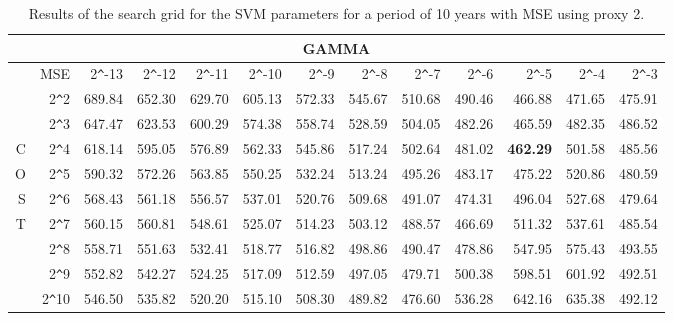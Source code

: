 \begin{table}[h!]
\centering
\begin{adjustbox}{width=\textwidth}
\begin{tabular}{|r|r|rrrrrrrrrrr|}
\hline
\multicolumn{13}{|c|}{GAMMA} \tabularnewline
\hline
 &MSE& 2\verb|^|-13 & 2\verb|^|-12 & 2\verb|^|-11 & 2\verb|^|-10 & 2\verb|^|-9 & 2\verb|^|-8 & 2\verb|^|-7 & 2\verb|^|-6 & 2\verb|^|-5 & 2\verb|^|-4 & 2\verb|^|-3 \\ 
  \hline
  &2\verb|^|2 & 689.84 & 652.30 & 629.70 & 605.13 & 572.33 & 545.67 & 510.68 & 490.46 & 466.88 & 471.65 & 475.91 \\ 
  &2\verb|^|3 & 647.47 & 623.53 & 600.29 & 574.38 & 558.74 & 528.59 & 504.05 & 482.26 & 465.59 & 482.35 & 486.52 \\ 
  C&2\verb|^|4 & 618.14 & 595.05 & 576.89 & 562.33 & 545.86 & 517.24 & 502.64 & 481.02 & \textbf{462.29} & 501.58 & 485.56 \\ 
  O&2\verb|^|5 & 590.32 & 572.26 & 563.85 & 550.25 & 532.24 & 513.24 & 495.26 & 483.17 & 475.22 & 520.86 & 480.59 \\ 
  S&2\verb|^|6 & 568.43 & 561.18 & 556.57 & 537.01 & 520.76 & 509.68 & 491.07 & 474.31 & 496.04 & 527.68 & 479.64 \\ 
  T&2\verb|^|7 & 560.15 & 560.81 & 548.61 & 525.07 & 514.23 & 503.12 & 488.57 & 466.69 & 511.32 & 537.61 & 485.54 \\ 
  &2\verb|^|8 & 558.71 & 551.63 & 532.41 & 518.77 & 516.82 & 498.86 & 490.47 & 478.86 & 547.95 & 575.43 & 493.55 \\ 
  &2\verb|^|9 & 552.82 & 542.27 & 524.25 & 517.09 & 512.59 & 497.05 & 479.71 & 500.38 & 598.51 & 601.92 & 492.51 \\ 
  &2\verb|^|10 & 546.50 & 535.82 & 520.20 & 515.10 & 508.30 & 489.82 & 476.60 & 536.28 & 642.16 & 635.38 & 492.12 \\ 
   \hline
\end{tabular}
\end{adjustbox}
\caption{Results of the search grid for the SVM parameters for a period of 10 years with MSE using proxy 2.}
\end{table}